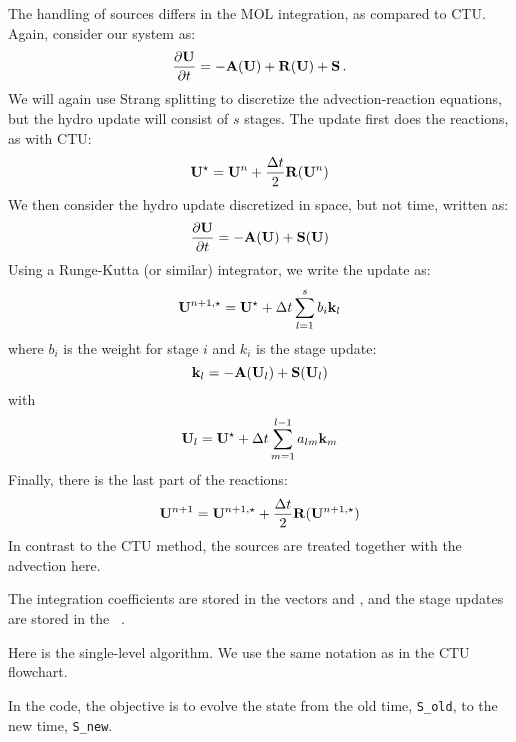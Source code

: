 The handling of sources differs in the MOL integration, as compared to CTU.
Again, consider our system as:
\begin{equation}
\frac{\partial{\bf U}}{\partial t} = -{\bf A}({\bf U}) + {\bf R}({\bf U}) + {\bf S} \, .
\end{equation}
We will again use Strang splitting to discretize the
advection-reaction equations, but the hydro update will consist of $s$
stages.  The update first does the reactions, as with CTU:
\begin{equation}
{\bf U}^\star = {\bf U}^n + \frac{\Delta t}{2}{\bf R}({\bf U}^n)
\end{equation}
We then consider the hydro update discretized in space, but not time, written
as:
\begin{equation}
\frac{\partial {\bf U}}{\partial t} = -{\bf A}({\bf U}) + {\bf S}({\bf U})
\end{equation}
Using a Runge-Kutta (or similar) integrator, we write the update as:
\begin{equation}
{\bf U}^{n+1,\star} = {\bf U}^\star + \Delta t \sum_{l=1}^s b_i {\bf k}_l
\end{equation}
where $b_i$ is the weight for stage $i$ and $k_i$ is the stage update:
\begin{equation}
{\bf k}_l = -{\bf A}({\bf U}_l) + {\bf S}({\bf U}_l)
\end{equation}
with 
\begin{equation}
{\bf U}_l = {\bf U}^\star  + \Delta t \sum_{m=1}^{l-1} a_{lm} {\bf k}_m
\end{equation}
Finally, there is the last part of the reactions:
\begin{equation}
{\bf U}^{n+1} = {\bf U}^{n+1,\star} + \frac{\Delta t}{2} {\bf R}({\bf U}^{n+1,\star})
\end{equation}
In contrast to the CTU method, the sources are treated together
with the advection here.

The integration coefficients are stored in the vectors
 and , and the stage updates are
stored in the \multifab\ .

Here is the single-level algorithm.  We use the same notation
as in the CTU flowchart.

In the code, the objective is to evolve the state from the old time,
{\tt S\_old}, to the new time, {\tt S\_new}.

